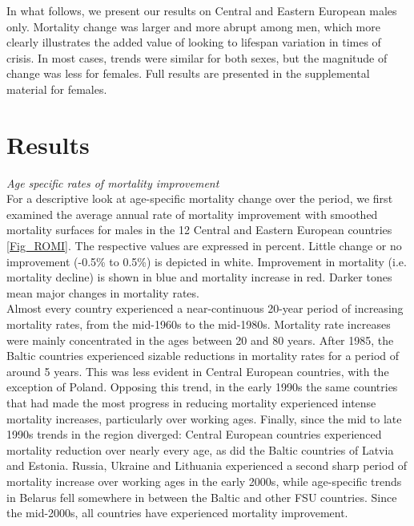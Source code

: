 \documentclass{article}
\begin{document}
\begin{spacing}{1.5}
In what follows, we present our results on Central and Eastern European males only. Mortality change was larger and more abrupt among men, which more clearly illustrates the added value of looking to lifespan variation in times of crisis. In most cases, trends were similar for both sexes, but the magnitude of change was less for females. Full results are presented in the supplemental material for females.\\



\section*{Results}
\emph{Age specific rates of mortality improvement}\\

For a descriptive look at age-specific mortality change over the period, we first examined the average annual rate of mortality improvement \citep{Rau2013} with smoothed mortality surfaces \citep{Camarda2012} for males in the 12 Central and Eastern European countries \ref{Fig_ROMI}. The respective values are expressed in percent. Little change or no improvement (-0.5\% to 0.5\%) is depicted in white. Improvement in mortality (i.e. mortality decline) is shown in blue and mortality increase in red. Darker tones mean major changes in mortality rates.\\

Almost every country experienced a near-continuous 20-year period of increasing mortality rates, from the mid-1960s to the mid-1980s. Mortality rate increases were mainly concentrated in the ages between 20 and 80 years. After 1985, the Baltic 	 countries experienced sizable reductions in mortality rates for a period of around 5 years. This was less evident in Central European countries, with the exception of Poland. Opposing this trend, in the early 1990s the same countries that had made the most progress in reducing mortality experienced intense mortality increases, particularly over working ages. Finally, since the mid to late 1990s trends in the region diverged: Central European countries experienced mortality reduction over nearly every age, as did the Baltic countries of Latvia and Estonia. Russia, Ukraine and Lithuania experienced a second sharp period of mortality increase over working ages in the early 2000s, while age-specific trends in Belarus fell somewhere in between the Baltic and other FSU countries. Since the mid-2000s, all countries have experienced mortality improvement.\\




\end{spacing}
\end{document}
